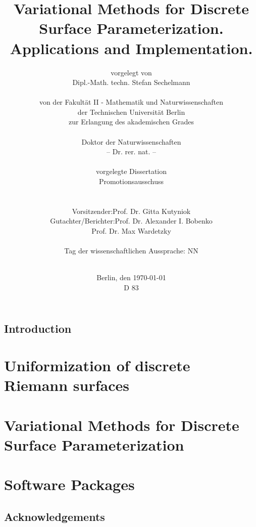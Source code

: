 \documentclass[a4paper]{book}
\title{Variational Methods for Discrete Surface Parameterization. Applications and Implementation.}
\author{
vorgelegt von\\
Dipl.-Math. techn. Stefan Sechelmann\\
\vspace{0.3cm}\\
von der Fakult{\"a}t II - Mathematik und Naturwissenschaften\\
der Technischen Universit{\"a}t Berlin\\
zur Erlangung des akademischen Grades\\
\vspace{0.3cm}\\
Doktor der Naturwissenschaften\\
-- Dr. rer. nat. --\\
\vspace{0.3cm}\\
vorgelegte Dissertation
\vspace{1.5cm}\\
Promotionsausschuss\\
\vspace{0.3cm}\\
\begin{tabular}{rl}
Vorsitzender: & Prof. Dr. Gitta Kutyniok \\
Gutachter/Berichter: & Prof. Dr. Alexander I. Bobenko \\
& Prof. Dr. Max Wardetzky 
\end{tabular}
\vspace{0.3cm}\\
Tag der wissenschaftlichen Aussprache: NN\\
\vspace{1cm}\\
}
\date{
	Berlin, den {\selectlanguage{german}\today}\\
	\vspace{0.3cm}
	D 83
}
\def\mainbibliography {
	\backmatter
	\setcounter{secnumdepth}{-1} 
	
	
}
\def\subfilebibliography {
	\backmatter
	\setcounter{secnumdepth}{-1} 
	
	
}
\def\subfilebibliographytwo {
	\backmatter
	\setcounter{secnumdepth}{-1} 
	
	
}
\begin{document}
\def\subfilebibliography{}
\def\subfilebibliographytwo{}

\frontmatter
\maketitle
\newpage

\tableofcontents
\newpage
\listoffigures

\newpage
\mainmatter
\setcounter{secnumdepth}{-1} 
\chapter{Introduction}
\setcounter{secnumdepth}{2} 
\part{Uniformization of discrete Riemann surfaces}



\part{Variational Methods for Discrete Surface Parameterization}




\part{Software Packages}





\newpage 
\mainbibliography

\chapter{Acknowledgements}
\end{document}

